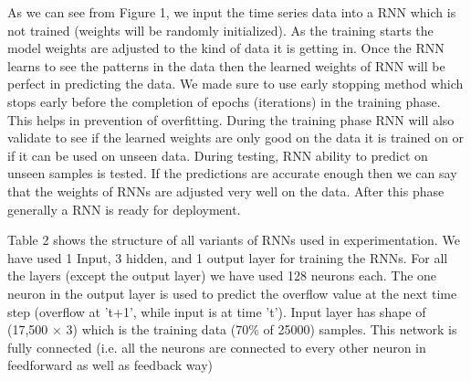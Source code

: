 \documentclass[sigconf,authordraft]{acmart}
\begin{document}
As we can see from Figure 1, we input the time series data into a RNN which is not trained (weights will be randomly initialized). As the training starts the model weights are adjusted to the kind of data it is getting in. Once the RNN learns to see the patterns in the data then the learned weights of RNN will be perfect in predicting the data. We made sure to use early stopping method which stops early before the completion of epochs (iterations) in the training phase. This helps in prevention of overfitting. During the training phase RNN will also validate to see if the learned weights are only good on the data it is trained on or if it can be used on unseen data. During testing, RNN ability to predict on unseen samples is tested. If the predictions are accurate enough then we can say that the weights of RNNs are adjusted very well on the data. After this phase generally a RNN is ready for deployment.%

Table 2 shows the structure of all variants of RNNs used in experimentation. We have used 1 Input, 3 hidden, and 1 output layer for training the RNNs. For all the layers (except the output layer) we have used 128 neurons each. The one neuron in the output layer is used to predict the overflow value at the next time step (overflow at 't+1', while input is at time 't'). Input layer has shape of (17,500 $\times$ 3) which is the training data (70\% of 25000) samples. This network is fully connected (i.e. all the neurons are connected to every other neuron in feedforward as well as feedback way)
\end{document}
